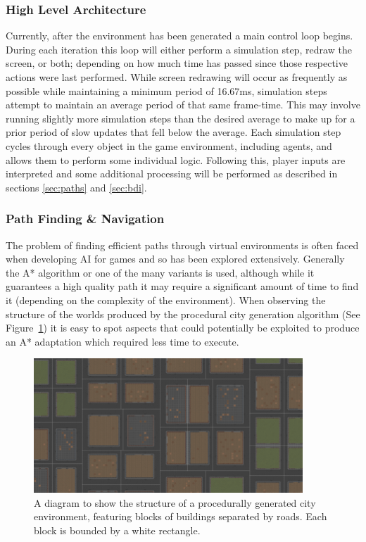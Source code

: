 \documentclass[12pt,a4paper]{article}
\begin{document}
\subsubsection{High Level Architecture}\noindent
Currently, after the environment has been generated a main control loop begins. During each iteration this loop will either perform a simulation step, redraw the screen, or both; depending on how much time has passed since those respective actions were last performed. While screen redrawing will occur as frequently as possible while maintaining a minimum period of 16.67ms, simulation steps attempt to maintain an average period of that same frame-time. This may involve running slightly more simulation steps than the desired average to make up for a prior period of slow updates that fell below the average. Each simulation step cycles through every object in the game environment, including agents, and allows them to perform some individual logic. Following this, player inputs are interpreted and some additional processing will be performed as described in sections \ref{sec:paths} and \ref{sec:bdi}.

\subsubsection{Path Finding \& Navigation}\noindent
The problem of finding efficient paths through virtual environments is often faced when developing AI for games and so has been explored extensively. Generally the A* algorithm \cite{bulitko10} or one of the many variants is used, although while it guarantees a high quality path it may require a significant amount of time to find it (depending on the complexity of the environment). When observing the structure of the worlds produced by the procedural city generation algorithm (See Figure~\ref{fig:block}) it is easy to spot aspects that could potentially be exploited to produce an A* adaptation which required less time to execute.

\label{sec:paths}
\begin{figure}[h]
\centering
\includegraphics[width=0.9\textwidth]{blocks}
\caption{A diagram to show the structure of a procedurally generated city environment, featuring blocks of buildings separated by roads. Each block is bounded by a white rectangle.}
\label{fig:block}
\end{figure}
\end{document}
